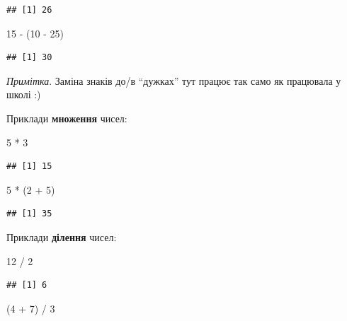 \documentclass[
]{book}
\newenvironment{Shaded}{\begin{snugshade}}{\end{snugshade}}
\newcommand{\DecValTok}[1]{\textcolor[rgb]{0.00,0.00,0.81}{#1}}
\newcommand{\NormalTok}[1]{#1}
\newcommand{\SpecialCharTok}[1]{\textcolor[rgb]{0.00,0.00,0.00}{#1}}
\begin{document}
\begin{verbatim}
## [1] 26
\end{verbatim}

\begin{Shaded}
\begin{Highlighting}[]
\DecValTok{15} \SpecialCharTok{{-}}\NormalTok{ (}\DecValTok{10} \SpecialCharTok{{-}} \DecValTok{25}\NormalTok{)}
\end{Highlighting}
\end{Shaded}

\begin{verbatim}
## [1] 30
\end{verbatim}

\emph{Примітка}. Заміна знаків до/в ``дужках'' тут працює так само як працювала у школі :)

Приклади \textbf{множення} чисел:

\begin{Shaded}
\begin{Highlighting}[]
\DecValTok{5} \SpecialCharTok{*} \DecValTok{3}
\end{Highlighting}
\end{Shaded}

\begin{verbatim}
## [1] 15
\end{verbatim}

\begin{Shaded}
\begin{Highlighting}[]
\DecValTok{5} \SpecialCharTok{*}\NormalTok{ (}\DecValTok{2} \SpecialCharTok{+} \DecValTok{5}\NormalTok{)}
\end{Highlighting}
\end{Shaded}

\begin{verbatim}
## [1] 35
\end{verbatim}

Приклади \textbf{ділення} чисел:

\begin{Shaded}
\begin{Highlighting}[]
\DecValTok{12} \SpecialCharTok{/} \DecValTok{2}
\end{Highlighting}
\end{Shaded}

\begin{verbatim}
## [1] 6
\end{verbatim}

\begin{Shaded}
\begin{Highlighting}[]
\NormalTok{(}\DecValTok{4} \SpecialCharTok{+} \DecValTok{7}\NormalTok{) }\SpecialCharTok{/} \DecValTok{3}
\end{Highlighting}
\end{Shaded}
\end{document}
